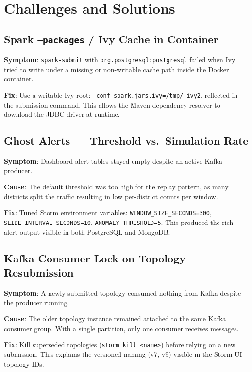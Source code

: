 \documentclass[12pt,a4paper]{article}
\begin{document}
\section{Challenges and Solutions}

\subsection{Spark \texttt{--packages} / Ivy Cache in Container}

\textbf{Symptom}: \texttt{spark-submit} with \texttt{org.postgresql:postgresql} failed when Ivy tried to write under a missing or non-writable cache path inside the Docker container.

\textbf{Fix}: Use a writable Ivy root: \texttt{--conf spark.jars.ivy=/tmp/.ivy2}, reflected in the submission command. This allows the Maven dependency resolver to download the JDBC driver at runtime.

\subsection{Ghost Alerts — Threshold vs.\ Simulation Rate}

\textbf{Symptom}: Dashboard alert tables stayed empty despite an active Kafka producer.

\textbf{Cause}: The default threshold was too high for the replay pattern, as many districts split the traffic resulting in low per-district counts per window.

\textbf{Fix}: Tuned Storm environment variables: \texttt{WINDOW\_SIZE\_SECONDS=300}, \texttt{SLIDE\_INTERVAL\_SECONDS=10}, \texttt{ANOMALY\_THRESHOLD=5}. This produced the rich alert output visible in both PostgreSQL and MongoDB.

\subsection{Kafka Consumer Lock on Topology Resubmission}

\textbf{Symptom}: A newly submitted topology consumed nothing from Kafka despite the producer running.

\textbf{Cause}: The older topology instance remained attached to the same Kafka consumer group. With a single partition, only one consumer receives messages.

\textbf{Fix}: Kill superseded topologies (\texttt{storm kill <name>}) before relying on a new submission. This explains the versioned naming (v7, v9) visible in the Storm UI topology IDs.
\end{document}
